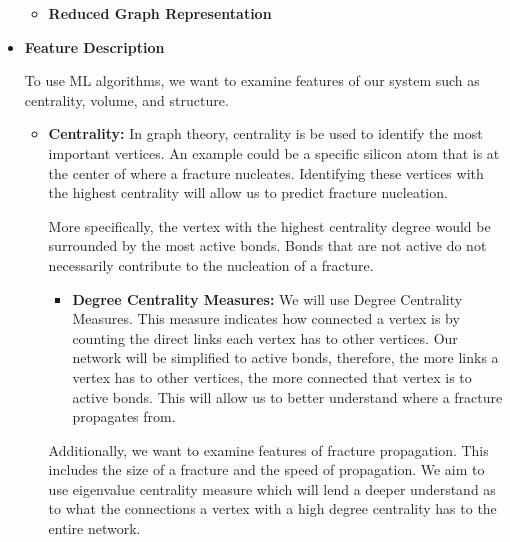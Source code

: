 \begin{itemize}
\begin{itemize}
    \item \textbf{Reduced Graph Representation}
    \\
    
    
\end{itemize}


\item \textbf{Feature Description}
\bigskip

To use ML algorithms, we want to examine features of our system such as centrality, volume, and structure.

\begin{itemize}
    \item \textbf{Centrality:} In graph theory, centrality is be used to identify the most important vertices. An example could be a specific silicon atom that is at the center of where a fracture nucleates. Identifying these vertices with the highest centrality will allow us to predict fracture nucleation.
    
    \bigskip
    
    More specifically, the vertex with the highest centrality degree would be surrounded by the most active bonds. Bonds that are not active do not necessarily contribute to the nucleation of a fracture.
    
    \begin{itemize}
        \item \textbf{Degree Centrality Measures:} We will use Degree Centrality Measures. This measure indicates how connected a vertex is by counting the direct links each vertex has to other vertices. Our network will be simplified to active bonds, therefore, the more links a vertex has to other vertices, the more connected that vertex is to active bonds. This will allow us to better understand where a fracture propagates from. 
    \end{itemize}
    
    \bigskip
    
    Additionally, we want to examine features of fracture propagation. This includes the size of a fracture and the speed of propagation. We aim to use eigenvalue centrality measure which will lend a deeper understand as to what the connections a vertex with a high degree centrality has to the entire network.
    

\end{itemize}
\end{itemize}
